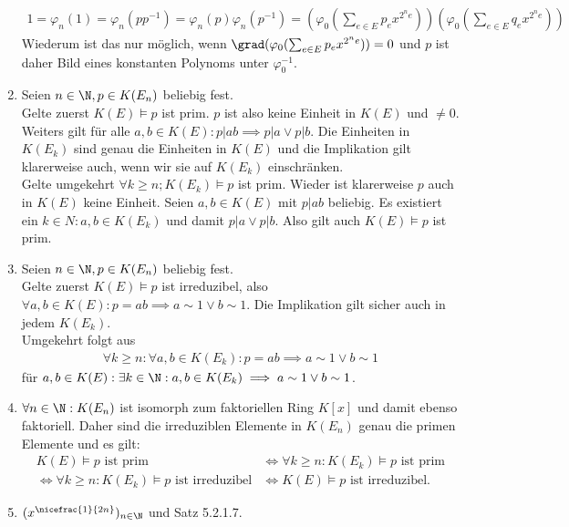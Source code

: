 \begin{solution}
\begin{enumerate}
\begin{align*}
    1 = \varphi_n(1) = \varphi_n(pp^{-1}) = \varphi_n(p)\varphi_n(p^{-1})
    = \left(\varphi_0(\sum_{e \in E}p_ex^{2^ne})\right)\left(\varphi_0(\sum_{e \in E}q_ex^{2^ne})\right)
  \end{align*}
  Wiederum ist das nur möglich, wenn $\grad(\varphi_0(\sum_{e \in E}p_ex^{2^ne})) = 0$
  und $p$ ist daher Bild eines konstanten Polynoms unter $\varphi_0^{-1}$.
  \item Seien $n \in \N, p \in K(E_n)$ beliebig fest. \\
  Gelte zuerst $K(E) \vDash p$ ist prim. $p$ ist also keine Einheit in $K(E)$
  und $\neq 0$. Weiters gilt für alle $a,b \in K(E): p|ab \implies p|a \lor p|b$.
  Die Einheiten in $K(E_k)$ sind genau die Einheiten in $K(E)$ und die Implikation
  gilt klarerweise auch, wenn wir sie auf $K(E_k)$ einschränken. \\
  Gelte umgekehrt $\forall k \geq n; K(E_k) \vDash p$ ist prim.
  Wieder ist klarerweise $p$ auch in $K(E)$ keine Einheit.
  Seien $a,b \in K(E)$ mit $p|ab$ beliebig. Es existiert ein $k \in N: a,b \in K(E_k)$
  und damit $p|a \lor p|b$. Also gilt auch $K(E) \vDash p$ ist prim.
  \item Seien $n \in \N, p \in K(E_n)$ beliebig fest. \\
  Gelte zuerst $K(E) \vDash p$ ist irreduzibel, also
  $\forall a,b \in K(E): p = ab \implies a \sim 1 \lor b \sim 1$.
  Die Implikation gilt sicher auch in jedem $K(E_k)$. \\
  Umgekehrt folgt aus
  \begin{align*}
    \forall k \geq n: \forall a,b \in K(E_k): p = ab \implies a \sim 1 \lor b \sim 1
  \end{align*}
  für $a,b \in K(E): \exists k \in \N: a,b \in K(E_k) \implies a \sim 1 \lor b \sim 1$.
  \item $\forall n \in \N: K(E_n)$ ist isomorph zum faktoriellen Ring $K[x]$ und damit ebenso faktoriell. Daher sind
  die irreduziblen Elemente in $K(E_n)$ genau die primen Elemente und es gilt:
  \begin{align*}
    K(E) \vDash p \text{ ist prim } &\iff \forall k \geq n: K(E_k) \vDash p \text{ ist prim} \\
    \iff \forall k \geq n: K(E_k) \vDash p \text{ ist irreduzibel}
    &\iff K(E) \vDash p \text{ ist irreduzibel}.
  \end{align*}
  \item $(x^{\nicefrac{1}{2n}})_{n \in \N}$ und Satz 5.2.1.7.
\end{enumerate}
\end{solution}
